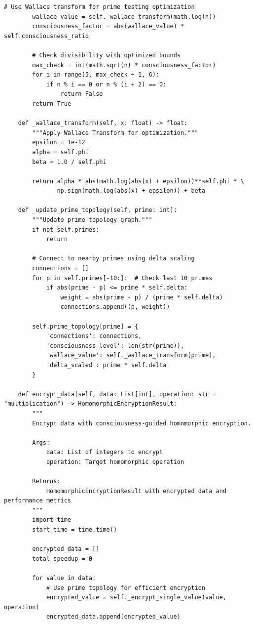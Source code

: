 \begin{lstlisting}[caption={Consciousness-Guided Homomorphic Encryption},label={code:homomorphic_encryption}]
        # Use Wallace transform for prime testing optimization
        wallace_value = self._wallace_transform(math.log(n))
        consciousness_factor = abs(wallace_value) * self.consciousness_ratio
        
        # Check divisibility with optimized bounds
        max_check = int(math.sqrt(n) * consciousness_factor)
        for i in range(5, max_check + 1, 6):
            if n % i == 0 or n % (i + 2) == 0:
                return False
        return True
    
    def _wallace_transform(self, x: float) -> float:
        """Apply Wallace Transform for optimization."""
        epsilon = 1e-12
        alpha = self.phi
        beta = 1.0 / self.phi
        
        return alpha * abs(math.log(abs(x) + epsilon))**self.phi * \
               np.sign(math.log(abs(x) + epsilon)) + beta
    
    def _update_prime_topology(self, prime: int):
        """Update prime topology graph."""
        if not self.primes:
            return
        
        # Connect to nearby primes using delta scaling
        connections = []
        for p in self.primes[-10:]:  # Check last 10 primes
            if abs(prime - p) <= prime * self.delta:
                weight = abs(prime - p) / (prime * self.delta)
                connections.append((p, weight))
        
        self.prime_topology[prime] = {
            'connections': connections,
            'consciousness_level': len(str(prime)),
            'wallace_value': self._wallace_transform(prime),
            'delta_scaled': prime * self.delta
        }
    
    def encrypt_data(self, data: List[int], operation: str = "multiplication") -> HomomorphicEncryptionResult:
        """
        Encrypt data with consciousness-guided homomorphic encryption.
        
        Args:
            data: List of integers to encrypt
            operation: Target homomorphic operation
        
        Returns:
            HomomorphicEncryptionResult with encrypted data and performance metrics
        """
        import time
        start_time = time.time()
        
        encrypted_data = []
        total_speedup = 0
        
        for value in data:
            # Use prime topology for efficient encryption
            encrypted_value = self._encrypt_single_value(value, operation)
            encrypted_data.append(encrypted_value)
            

\end{lstlisting}
